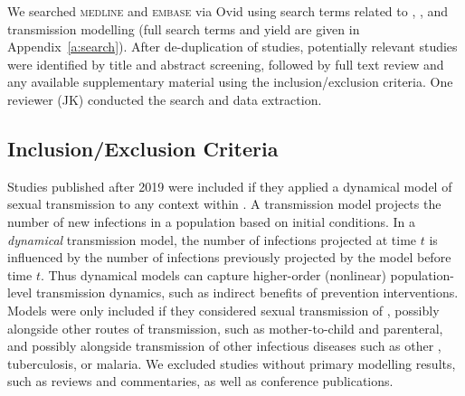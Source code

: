 We searched \textsc{medline} and \textsc{embase} via Ovid  %
using search terms related to \hiv, \ssa, and transmission modelling
(full search terms and yield are given in Appendix~\ref{a:search}).
After de-duplication of studies,
potentially relevant studies were identified by title and abstract screening, 
followed by full text review and any available supplementary material using the inclusion/exclusion criteria.
One reviewer (JK) conducted the search and data extraction.
\subsection{Inclusion/Exclusion Criteria} %
\label{ss:meth:inex}
Studies published after 2019 were included if
they applied a dynamical model of sexual \hiv transmission
to any context within \ssa.
A \hiv transmission model projects the number of new \hiv infections  %
in a population based on initial conditions.
In a \emph{dynamical} transmission model,
the number of infections projected at time $t$ is influenced by
the number of infections previously projected by the model before time $t$.
Thus dynamical models can capture
higher-order (nonlinear) population-level transmission dynamics,
such as indirect benefits of prevention interventions.
Models were only included if they considered sexual transmission of \hiv,
possibly alongside other routes of transmission,
such as mother-to-child and parenteral,
and possibly alongside transmission of other infectious diseases
such as other \sti, tuberculosis, or malaria.
We excluded studies without primary modelling results,
such as reviews and commentaries,
as well as conference publications.
